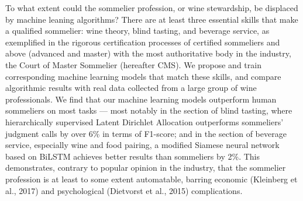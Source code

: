To what extent could the sommelier profession, or wine stewardship, be displaced by machine leaning algorithms? There are at least three essential skills that make a qualified sommelier: wine theory, blind tasting, and beverage service, as exemplified in the rigorous certification processes of certified sommeliers and above (advanced and master) with the most authoritative body in the industry, the Court of Master Sommelier (hereafter CMS). We propose and train corresponding machine learning models that match these skills, and compare algorithmic results with real data collected from a large group of wine professionals. We find that our machine learning models outperform human sommeliers on most tasks — most notably in the section of blind tasting, where hierarchically supervised Latent Dirichlet Allocation outperforms sommeliers' judgment calls by over 6\% in terms of F1-score; and in the section of beverage service, especially wine and food pairing, a modified Siamese neural network based on BiLSTM achieves better results than sommeliers by 2\%. This demonstrates, contrary to popular opinion in the industry, that the sommelier profession is at least to some extent automatable, barring economic (Kleinberg et al., 2017) and psychological (Dietvorst et al., 2015) complications.
